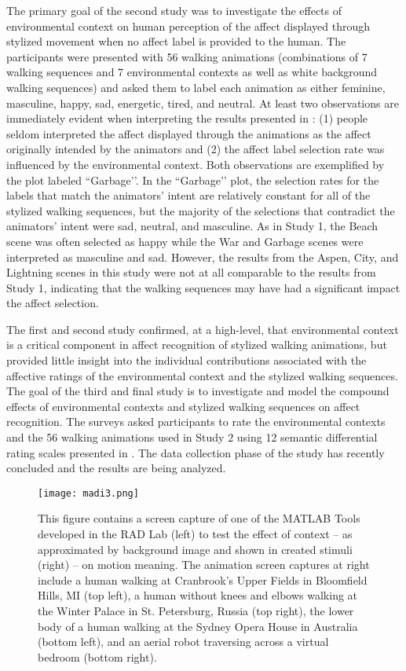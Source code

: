 \documentclass[arts,article,submit,moreauthors,pdftex,10pt,a4paper]{mdpi}
\begin{document}
The primary goal of the second study was to investigate the effects of environmental context on human perception of the affect displayed through stylized movement when no affect label is provided to the human. The participants were presented with 56 walking animations (combinations of 7 walking sequences and 7 environmental contexts as well as white background walking sequences) and asked them to label each animation as either feminine, masculine, happy, sad, energetic, tired, and neutral.  At least two observations are immediately evident when interpreting the results presented in \cite{madi2017ICSR}: (1) people seldom interpreted the affect displayed through the animations as the affect originally intended by the animators and (2) the affect label selection rate was influenced by the environmental context. Both observations are exemplified by the plot labeled ``Garbage’’. In the ``Garbage’’ plot, the selection rates for the labels that match the animators’ intent are relatively constant for all of the stylized walking sequences, but the majority of the selections that contradict the animators’ intent were sad, neutral, and masculine. As in Study 1, the Beach scene was often selected as happy while the War and Garbage scenes were interpreted as masculine and sad. However, the results from the Aspen, City, and Lightning scenes in this study were not at all comparable to the results from Study 1, indicating that the walking sequences may have had a significant impact the affect selection. 

The first and second study confirmed, at a high-level, that environmental context is a critical component in affect recognition of stylized walking animations, but provided little insight into the individual contributions associated with the affective ratings of the environmental context and the stylized walking sequences. The goal of the third and final study is to investigate and model the compound effects of environmental contexts and stylized walking sequences on affect recognition. The surveys asked participants to rate the environmental contexts and the 56 walking animations used in Study 2 using 12 semantic differential rating scales presented in \cite{bradley1994measuring}. The data collection phase of the study has recently concluded and the results are being analyzed. 

\begin{figure}[h!]
\centering
\vspace{-.1in}
\texttt{[image: madi3.png]}
\caption{This figure contains a screen capture of one of the MATLAB Tools developed in the RAD Lab (left) to test the effect of context -- as approximated by background image and shown in created stimuli (right) -- on motion meaning.  The animation screen captures at right include a human walking at Cranbrook’s Upper Fields in Bloomfield Hills, MI (top left), a human without knees and elbows walking at the Winter Palace in St. Petersburg, Russia (top right), the lower body of a human walking at the Sydney Opera House in Australia (bottom left), and an aerial robot traversing across a virtual bedroom (bottom right).}
\label{madi2}
\end{figure}
\end{document}
